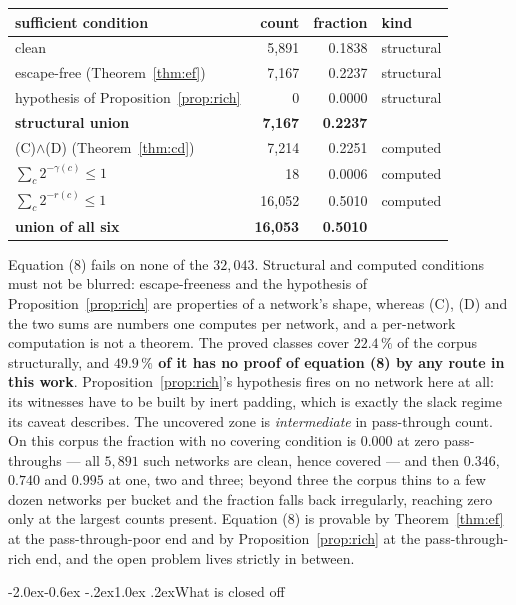 \documentclass[11pt,a4paper]{article}
\makeatletter
\renewcommand\subsection{\@startsection{subsection}{2}{\z@}%
  {-2.0ex\@plus -0.6ex \@minus -.2ex}{1.0ex \@plus .2ex}{\normalfont\normalsize\bfseries}}
\makeatother
\begin{document}
\begin{center}
\begin{tabular}{lrrl}
\toprule
sufficient condition & count & fraction & kind \\
\midrule
clean & 5{,}891 & 0.1838 & structural \\
escape-free (Theorem~\ref{thm:ef}) & 7{,}167 & 0.2237 & structural \\
hypothesis of Proposition~\ref{prop:rich} & 0 & 0.0000 & structural \\
\textbf{structural union} & \textbf{7{,}167} & \textbf{0.2237} & \\
(C)$\wedge$(D) (Theorem~\ref{thm:cd}) & 7{,}214 & 0.2251 & computed \\
$\sum_c 2^{-\gamma(c)} \le 1$ & 18 & 0.0006 & computed \\
$\sum_c 2^{-r(c)} \le 1$ & 16{,}052 & 0.5010 & computed \\
\textbf{union of all six} & \textbf{16{,}053} & \textbf{0.5010} & \\
\bottomrule
\end{tabular}
\end{center}

Equation (8) fails on none of the $32{,}043$. Structural and computed conditions
must not be blurred: escape-freeness and the hypothesis of
Proposition~\ref{prop:rich} are properties of a network's shape, whereas (C),
(D) and the two sums are numbers one computes per network, and a per-network
computation is not a theorem. The proved classes cover $22.4\,\%$ of the corpus
structurally, and \textbf{$49.9\,\%$ of it has no proof of equation (8) by any
route in this work}. Proposition~\ref{prop:rich}'s hypothesis fires on no
network here at all: its witnesses have to be built by inert padding, which is
exactly the slack regime its caveat describes. The uncovered zone is
\emph{intermediate} in pass-through count. On this corpus the fraction with no
covering condition is $0.000$ at zero pass-throughs --- all $5{,}891$ such
networks are clean, hence covered --- and then $0.346$, $0.740$ and $0.995$ at
one, two and three; beyond three the corpus thins to a few dozen networks per
bucket and the fraction falls back irregularly, reaching zero only at the
largest counts present. Equation (8) is provable by Theorem~\ref{thm:ef} at the
pass-through-poor end and by Proposition~\ref{prop:rich} at the
pass-through-rich end, and the open problem lives strictly in between.

\subsection{What is closed off}
\end{document}
